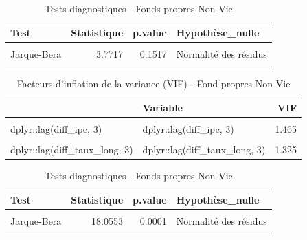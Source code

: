 \documentclass[
]{article}
\begin{document}
\begin{longtable}[t]{lrrl}
\caption{\label{tab:unnamed-chunk-49}Tests diagnostiques - Fonds propres Non-Vie}\\
\toprule
Test & Statistique & p.value & Hypothèse\_nulle\\
\midrule
\cellcolor{gray!10}{Ljung-Box} & \cellcolor{gray!10}{0.3490} & \cellcolor{gray!10}{0.5547} & \cellcolor{gray!10}{Pas d'autocorrélation}\\
Jarque-Bera & 3.7717 & 0.1517 & Normalité des résidus\\
\cellcolor{gray!10}{Breusch-Pagan} & \cellcolor{gray!10}{1.3123} & \cellcolor{gray!10}{0.8593} & \cellcolor{gray!10}{Homoscédasticité}\\
\bottomrule
\end{longtable}

\begin{longtable}[t]{llr}
\caption{\label{tab:unnamed-chunk-49}Facteurs d'inflation de la variance (VIF) - Fond propres Non-Vie}\\
\toprule
 & Variable & VIF\\
\midrule
\cellcolor{gray!10}{dplyr::lag(diff\_fonds\_propres, 1)} & \cellcolor{gray!10}{dplyr::lag(diff\_fonds\_propres, 1)} & \cellcolor{gray!10}{1.055}\\
dplyr::lag(diff\_ipc, 3) & dplyr::lag(diff\_ipc, 3) & 1.465\\
\cellcolor{gray!10}{dplyr::lag(diff\_taux\_court, 3)} & \cellcolor{gray!10}{dplyr::lag(diff\_taux\_court, 3)} & \cellcolor{gray!10}{1.622}\\
dplyr::lag(diff\_taux\_long, 3) & dplyr::lag(diff\_taux\_long, 3) & 1.325\\
\bottomrule
\end{longtable}

\begin{longtable}[t]{lrrl}
\caption{\label{tab:unnamed-chunk-50}Tests diagnostiques - Fonds propres Non-Vie}\\
\toprule
Test & Statistique & p.value & Hypothèse\_nulle\\
\midrule
\cellcolor{gray!10}{Ljung-Box} & \cellcolor{gray!10}{0.0381} & \cellcolor{gray!10}{0.8452} & \cellcolor{gray!10}{Pas d'autocorrélation}\\
Jarque-Bera & 18.0553 & 0.0001 & Normalité des résidus\\
\cellcolor{gray!10}{Breusch-Pagan} & \cellcolor{gray!10}{0.2348} & \cellcolor{gray!10}{0.8892} & \cellcolor{gray!10}{Homoscédasticité}\\
\bottomrule
\end{longtable}
\end{document}
